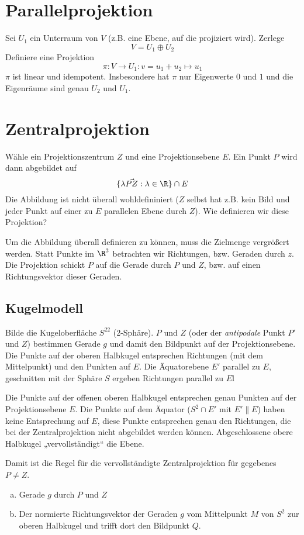 \documentclass{mycourse}
\begin{document}
\section{Parallelprojektion}


Sei $U_1$ ein Unterraum von $V$ (z.B. eine Ebene, auf die projiziert wird).
Zerlege
\[
	V = U_1 \oplus U_2
\]
Definiere eine Projektion
\[
	\pi : V \to U_1 : v = u_1 + u_2 \mapsto u_1
\]
$\pi$ ist linear und idempotent.
Insbesondere hat $\pi$ nur Eigenwerte $0$ und $1$ und die Eigenräume sind genau $U_2$ und $U_1$.


\section{Zentralprojektion}


Wähle ein Projektionszentrum $Z$ und eine Projektionsebene $E$.
Ein Punkt $P$ wird dann abgebildet auf
\[
	\{\lambda \vec{PZ} : \lambda\in \R\} \cap E
\]
Die Abbildung ist nicht überall wohldefininiert ($Z$ selbst hat z.B. kein Bild und jeder Punkt auf einer zu $E$ parallelen Ebene durch $Z$).
Wie definieren wir diese Projektion?

Um die Abbildung überall definieren zu können, muss die Zielmenge vergrößert werden.
Statt Punkte im $\R^3$ betrachten wir Richtungen, bzw. Geraden durch $z$.
Die Projektion schickt $P$ auf die Gerade durch $P$ und $Z$, bzw. auf einen Richtungsvektor dieser Geraden.


\subsection{Kugelmodell}


Bilde die Kugeloberfläche $S^22$ (2-Sphäre).
$P$ und $Z$ (oder der \emph{antipodale} Punkt $P'$ und $Z$) bestimmen Gerade $g$ und damit den Bildpunkt auf der Projektionsebene.
Die Punkte auf der oberen Halbkugel entsprechen Richtungen (mit dem Mittelpunkt) und den Punkten auf $E$.
Die Äquatorebene $E'$ parallel zu $E$, geschnitten mit der Sphäre $S$ ergeben Richtungen parallel zu $E$l

Die Punkte auf der offenen oberen Halbkugel entsprechen genau Punkten auf der Projektionsebene $E$.
Die Punkte auf dem Äquator ($S^2\cap E'$ mit $E'\|E$) haben keine Entsprechung auf $E$, diese Punkte entsprechen genau den Richtungen, die bei der Zentralprojektion nicht abgebildet werden können.
Abgeschlossene obere Halbkugel „vervollständigt“ die Ebene.

Damit ist die Regel für die vervollständigte Zentralprojektion für gegebenes $P\neq Z$.
\begin{enumerate}[a.]
	\item
		Gerade $g$ durch $P$ und $Z$
	\item
		Der normierte Richtungsvektor der Geraden $g$ vom Mittelpunkt $M$ von $S^2$ zur oberen Halbkugel und trifft dort den Bildpunkt $Q$.
\end{enumerate}
\end{document}
